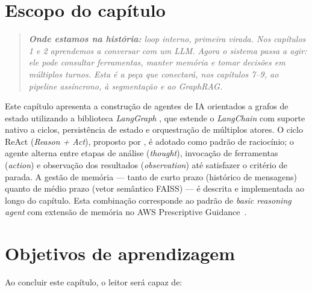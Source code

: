 \section{Escopo do cap\'itulo}

\begin{quote}\itshape
\textbf{Onde estamos na hist\'oria:} loop interno, primeira virada.
Nos cap\'itulos 1 e 2 aprendemos a conversar com um LLM. Agora o
sistema passa a \emph{agir}: ele pode consultar ferramentas, manter
mem\'oria e tomar decis\~oes em m\'ultiplos turnos. Esta \'e a
pe\c{c}a que conectar\'a, nos cap\'itulos 7--9, ao pipeline
ass\'incrono, \`a segmenta\c{c}\~ao e ao GraphRAG.
\end{quote}

Este cap\'itulo apresenta a constru\c{c}\~ao de agentes de IA orientados
a grafos de estado utilizando a biblioteca \textit{LangGraph}
\cite{langgraph2024}, que estende o \textit{LangChain}
\cite{chase2022langchain} com suporte nativo a ciclos, persist\^encia
de estado e orquestra\c{c}\~ao de m\'ultiplos atores. O ciclo ReAct
(\textit{Reason + Act}), proposto por , \'e
adotado como padr\~ao de racioc\'inio; o agente alterna entre etapas
de an\'alise (\textit{thought}), invoca\c{c}\~ao de ferramentas
(\textit{action}) e observa\c{c}\~ao dos resultados (\textit{observation})
at\'e satisfazer o crit\'erio de parada. A gest\~ao de mem\'oria ---
tanto de curto prazo (hist\'orico de mensagens) quanto de m\'edio prazo
(vetor sem\^antico FAISS) --- \'e descrita e implementada ao longo do
cap\'itulo. Esta combina\c{c}\~ao corresponde ao padr\~ao de \textit{basic reasoning agent}
com extens\~ao de mem\'oria no AWS Prescriptive Guidance~\cite{awsagentic2025}.

\section{Objetivos de aprendizagem}

Ao concluir este cap\'itulo, o leitor ser\'a capaz de:

